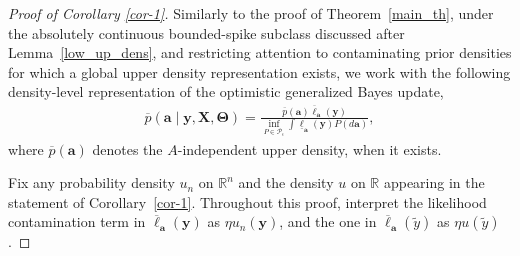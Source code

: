\documentclass[12pt, english, oneside, a4paper]{article}
\newcommand{\y}{\boldsymbol{y}}
\newcommand{\X}{\boldsymbol{X}}
\renewcommand{\a}{\boldsymbol{a}}
\newcommand{\bT}{\boldsymbol{\Theta}}
\begin{document}
\begin{proof}[Proof of Corollary \ref{cor-1}]
   Similarly to the proof of Theorem~\ref{main_th}, under the absolutely continuous bounded-spike subclass discussed after Lemma~\ref{low_up_dens}, and restricting attention to contaminating prior densities for which a global upper density representation exists, we work with the following density-level representation of the optimistic generalized Bayes update, 
    \begin{align}\label{gen-bayes2}
        \overline{p}(\a \mid \y, \X,\bT)=\frac{\overline{p}(\a) \overline{\ell}_{\a}(\y)}{\inf_{P\in\mathcal{P}_\epsilon} \int \underline{\ell}_{\a}(\y) P(d\a)},
    \end{align} 
where $\overline{p}(\a)$ denotes the $A$-independent upper density, when it exists.
    
Fix any probability density $u_n$ on $\mathbb{R}^n$ and the density $u$ on $\mathbb{R}$ appearing in the statement of Corollary~\ref{cor-1}.
Throughout this proof, interpret the likelihood contamination term in $\overline{\ell}_{\a}(\y)$ as $\eta u_n(\y)$, and the one in $\overline{\ell}_{\a}(\tilde y)$ as $\eta u(\tilde y)$.
    

\end{proof}
\end{document}
